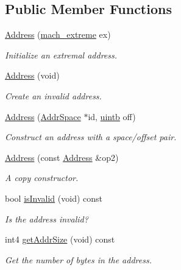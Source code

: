 \subsection*{Public Member Functions}
\begin{DoxyCompactItemize}
\item 
\mbox{\hyperlink{class_address_a84f096e8cab2cd71a252877055938759}{Address}} (\mbox{\hyperlink{class_address_ab6dfc48b4779dab420c4ae0bc5aaffd7}{mach\+\_\+extreme}} ex)
\begin{DoxyCompactList}\small\item\em Initialize an extremal address. \end{DoxyCompactList}\item 
\mbox{\hyperlink{class_address_a69a01db36be374e934ed33c773e31b7f}{Address}} (void)
\begin{DoxyCompactList}\small\item\em Create an invalid address. \end{DoxyCompactList}\item 
\mbox{\hyperlink{class_address_aa525e3d0433b8bbe9045465d78cfe5ae}{Address}} (\mbox{\hyperlink{class_addr_space}{Addr\+Space}} $\ast$id, \mbox{\hyperlink{types_8h_a2db313c5d32a12b01d26ac9b3bca178f}{uintb}} off)
\begin{DoxyCompactList}\small\item\em Construct an address with a space/offset pair. \end{DoxyCompactList}\item 
\mbox{\hyperlink{class_address_a29436dab23400efc18afcf58ce529082}{Address}} (const \mbox{\hyperlink{class_address}{Address}} \&op2)
\begin{DoxyCompactList}\small\item\em A copy constructor. \end{DoxyCompactList}\item 
bool \mbox{\hyperlink{class_address_a90ea7ea47a048afa95a14709e704d876}{is\+Invalid}} (void) const
\begin{DoxyCompactList}\small\item\em Is the address invalid? \end{DoxyCompactList}\item 
int4 \mbox{\hyperlink{class_address_a18dc61d8b617214f2ec054dabc3c9040}{get\+Addr\+Size}} (void) const
\begin{DoxyCompactList}\small\item\em Get the number of bytes in the address. \end{DoxyCompactList}\item 

\end{DoxyCompactItemize}
